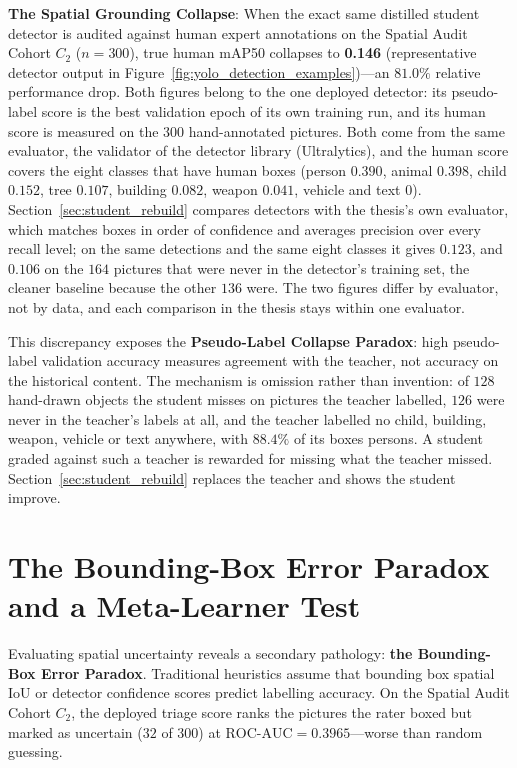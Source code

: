 \documentclass[12pt,a4paper]{report}
\begin{document}
\begin{flushleft}
\textbf{The Spatial Grounding Collapse}: When the exact same distilled student detector is audited against human expert annotations on the Spatial Audit Cohort $C_2$ ($n=300$), true human mAP50 collapses to \textbf{0.146} (representative detector output in Figure~\ref{fig:yolo_detection_examples})---an $81.0\%$ relative performance drop. Both figures belong to the one deployed detector: its pseudo-label score is the best validation epoch of its own training run, and its human score is measured on the $300$ hand-annotated pictures. Both come from the same evaluator, the validator of the detector library (Ultralytics), and the human score covers the eight classes that have human boxes (person $0.390$, animal $0.398$, child $0.152$, tree $0.107$, building $0.082$, weapon $0.041$, vehicle and text $0$). Section~\ref{sec:student_rebuild} compares detectors with the thesis's own evaluator, which matches boxes in order of confidence and averages precision over every recall level; on the same detections and the same eight classes it gives $0.123$, and $0.106$ on the $164$ pictures that were never in the detector's training set, the cleaner baseline because the other $136$ were. The two figures differ by evaluator, not by data, and each comparison in the thesis stays within one evaluator.
\end{flushleft}

This discrepancy exposes the \textbf{Pseudo-Label Collapse Paradox}: high pseudo-label validation accuracy measures agreement with the teacher, not accuracy on the historical content. The mechanism is omission rather than invention: of $128$ hand-drawn objects the student misses on pictures the teacher labelled, $126$ were never in the teacher's labels at all, and the teacher labelled no child, building, weapon, vehicle or text anywhere, with $88.4\%$ of its boxes persons. A student graded against such a teacher is rewarded for missing what the teacher missed. Section~\ref{sec:student_rebuild} replaces the teacher and shows the student improve.


\section{The Bounding-Box Error Paradox and a Meta-Learner Test}
\label{sec:box_error_paradox}
Evaluating spatial uncertainty reveals a secondary pathology: \textbf{the Bounding-Box Error Paradox}. Traditional heuristics assume that bounding box spatial IoU or detector confidence scores predict labelling accuracy. On the Spatial Audit Cohort $C_2$, the deployed triage score ranks the pictures the rater boxed but marked as uncertain ($32$ of $300$) at $\text{ROC-AUC} = 0.3965$---worse than random guessing.
\end{document}
